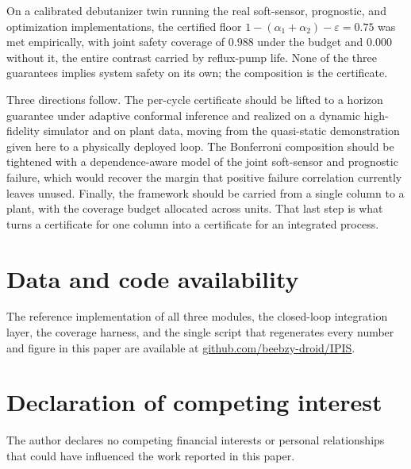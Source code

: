 \documentclass[review,12pt]{elsarticle}
\theoremstyle{definition}
\begin{document}
On a calibrated debutanizer twin running the real soft-sensor, prognostic, and
optimization implementations, the certified floor $1-(\alpha_1+\alpha_2)-\varepsilon =
0.75$ was met empirically, with joint safety coverage of $0.988$ under the budget and
$0.000$ without it, the entire contrast carried by reflux-pump life. None of the three
guarantees implies system safety on its own; the composition is the certificate.

Three directions follow. The per-cycle certificate should be lifted to a horizon
guarantee under adaptive conformal inference and realized on a dynamic high-fidelity
simulator and on plant data, moving from the quasi-static demonstration given here to a
physically deployed loop. The Bonferroni composition should be tightened with a
dependence-aware model of the joint soft-sensor and prognostic failure, which would
recover the margin that positive failure correlation currently leaves unused. Finally,
the framework should be carried from a single column to a plant, with the coverage budget
allocated across units. That last step is what turns a certificate for one column into a
certificate for an integrated process.


\section*{Data and code availability}
The reference implementation of all three modules, the closed-loop integration
layer, the coverage harness, and the single script that regenerates every number
and figure in this paper are available at \url{github.com/beebzy-droid/IPIS}.

\section*{Declaration of competing interest}
The author declares no competing financial interests or personal relationships that
could have influenced the work reported in this paper.
\end{document}

